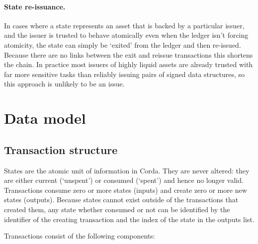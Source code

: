 \documentclass{article}
\begin{document}
\paragraph{State re-issuance.}In cases where a state represents an asset that is backed by a particular issuer,
and the issuer is trusted to behave atomically even when the ledger isn't forcing atomicity, the state can
simply be `exited' from the ledger and then re-issued. Because there are no links between the exit and reissue
transactions this shortens the chain. In practice most issuers of highly liquid assets are already trusted with
far more sensitive tasks than reliably issuing pairs of signed data structures, so this approach is unlikely to
be an issue.

\section{Data model}

\subsection{Transaction structure}

States are the atomic unit of information in Corda. They are never altered: they are either current (`unspent') or
consumed (`spent') and hence no longer valid.  Transactions consume zero or more states (inputs) and create zero or more
new states (outputs). Because states cannot exist outside of the transactions that created them, any state whether consumed
or not can be identified by the identifier of the creating transaction and the index of the state in the outputs list.

Transactions consist of the following components:
\end{document}
